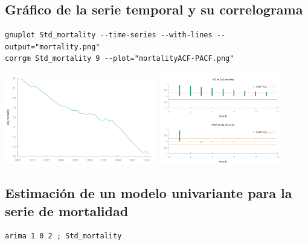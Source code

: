 \documentclass[10pt]{article}
\begin{document}
\subsection*{Gráfico de la serie temporal y su correlograma}
\label{sec:org8cb990d}

\begin{verbatim}
gnuplot Std_mortality --time-series --with-lines --output="mortality.png"
corrgm Std_mortality 9 --plot="mortalityACF-PACF.png"
\end{verbatim}


\begin{center}
\includegraphics[width=0.5\textwidth]{./mortality-marriages/mortality.png} 
\includegraphics[width=0.4\textwidth]{./mortality-marriages/mortalityACF-PACF.png} 
\end{center}
\subsection*{Estimación de un modelo univariante para la serie de mortalidad}
\label{sec:org1fd8471}

\begin{verbatim}
arima 1 0 2 ; Std_mortality
\end{verbatim}
\end{document}
